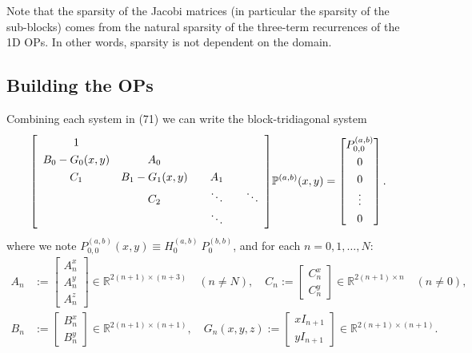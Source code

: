\documentclass[11pt, oneside]{article}   	%
\newcommand{\R}{\mathbb{R}}
\newcommand{\bigP}{\mathbb{P}}
\newcommand{\bigPab}{\bigP^{(a,b)}}
\begin{document}
Note that the sparsity of the Jacobi matrices (in particular the sparsity of the sub-blocks) comes from the natural sparsity of the three-term recurrences of the 1D OPs. In other words, sparsity is not dependent on the domain.




\subsection{Building the OPs} 

Combining each system in (71) we can write the block-tridiagonal system
\begin{align}
\renewcommand\arraystretch{1.3}
\mleft[
\begin{array}{cccc}
		1 & & & \\
		B_0-G_0(x,y) & A_0 & & \\
		C_1 & B_1-G_1(x,y) & \quad A_1 \quad & \\
		& C_2 & \ddots & \ddots \\
		& & \ddots &
\end{array}
\mright]
\bigPab(x,y)
=
\begin{bmatrix}
	P^{(a,b)}_{0,0} \\ 0 \\ 0 \\ \vdots \\ 0 \\
\end{bmatrix}.
\end{align}
where we note \(P^{(a,b)}_{0,0}(x,y) \equiv H_0^{(a,b)} \: P_0^{(b,b)}\), and for each \(n = 0,1,\dots,N\):
\begin{align}
A_n &:= \begin{bmatrix}
		A^x_n \\
		A^y_n \\
		A^z_n
	    \end{bmatrix} \in \R^{2(n+1)\times(n+3)} \quad (n \ne N), \quad
C_n := \begin{bmatrix}
		C^x_n \\
		C^y_n
	    \end{bmatrix} \in \R^{2(n+1)\times n} \quad (n \ne 0), \nonumber \\
B_n &:= \begin{bmatrix}
		B^x_n \\
		B^y_n
	    \end{bmatrix} \in \R^{2(n+1)\times(n+1)}, \quad
G_n(x,y,z) := \begin{bmatrix}
		xI_{n+1} \\
		yI_{n+1}
	    \end{bmatrix} \in \R^{2(n+1)\times(n+1)}.
\end{align}
 
\end{document}
